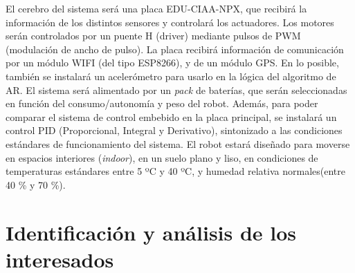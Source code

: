 \documentclass[11pt]{charter}
\begin{document}
\vspace{25px}

El cerebro del sistema será una placa EDU-CIAA-NPX, que recibirá la información de los distintos sensores y controlará los actuadores. Los motores serán controlados por un puente H (driver) mediante pulsos de PWM (modulación de ancho de pulso). La placa recibirá información de comunicación por un módulo WIFI (del tipo ESP8266), y de un módulo GPS. En lo posible, también se instalará un acelerómetro para usarlo en la lógica del algoritmo de AR.
El sistema será alimentado por un \textit{pack} de baterías, que serán seleccionadas en función del consumo/autonomía y peso del robot.
Además, para poder comparar el sistema de control embebido en la placa principal, se instalará un control PID (Proporcional, Integral y Derivativo), sintonizado a las condiciones estándares de funcionamiento del sistema.
El robot estará diseñado para moverse en espacios interiores (\textit{indoor}), en un suelo plano y liso, en condiciones de temperaturas estándares entre 5 ºC y 40 ºC, y humedad relativa normales(entre 40 \% y 70 \%). 




\section{Identificación y análisis de los interesados}
\label{sec:interesados}

 
 
\end{document}
